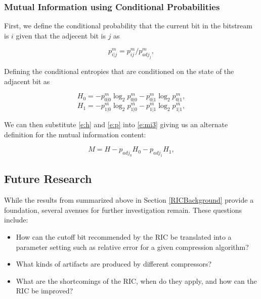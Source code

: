 \subsubsection{Mutual Information using Conditional Probabilities}

First, we define the conditional probability that the current bit in the bitstream is $i$ given that the adjecent bit is $j$ as

\begin{equation} \label{e:p}
p_{i|j}^m = p_{ij}^m/p_{adj_j}^m,
\end{equation}

Defining the conditional entropies that are conditioned on the state of the adjacent bit as 

\begin{equation} \label{e:h}
H_0 = -p_{0|0}^m\log_2p_{0|0}^m - p_{0|1}^m\log_2p_{0|1}^m,
\end{equation}
\begin{equation}
H_1 = -p_{1|0}^m\log_2p_{1|0}^m - p_{1|1}^m\log_2p_{1|1}^m,
\label{bpe2}
\end{equation}

We can then substitute \ref{e:h} and \ref{e:p} into \ref{e:mi3} giving us an alternate definition for the mutual information content:

\begin{equation}
M =  H - p_{adj_0}H_0 - p_{adj_1}H_1,
\label{ric}
\end{equation}


\subsection{Future Research}


 While the results from \cite{drbsd_real} summarized above in Section \ref{RICBackground} provide a foundation, several avenues for further investigation remain. These questions include:


\begin{itemize}

    \item How can the cutoff bit recommended by the RIC be translated into a parameter setting such as relative error for a given compression algorithm?

    \item What kinds of artifacts are produced by different compressors?

    \item What are the shortcomings of the RIC, when do they apply, and how can the RIC be improved?

\end{itemize}



